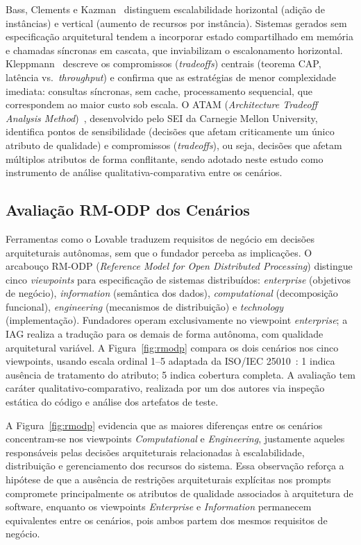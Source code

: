 \documentclass[sigconf]{acmart}
\begin{document}
Bass, Clements e Kazman~\cite{Bass2021} distinguem escalabilidade horizontal
(adição de instâncias) e vertical (aumento de recursos por instância). Sistemas
gerados sem especificação arquitetural tendem a incorporar estado compartilhado em
memória e chamadas síncronas em cascata, que inviabilizam o escalonamento
horizontal. Kleppmann~\cite{Kleppmann2017} descreve os compromissos (\textit{tradeoffs}) centrais (teorema
CAP, latência vs.\ \textit{throughput}) e confirma que as estratégias de menor complexidade
imediata: consultas síncronas, sem cache, processamento sequencial, que correspondem
ao maior custo sob escala. O ATAM (\textit{Architecture Tradeoff Analysis
Method})~\cite{Kazman2000}, desenvolvido pelo SEI da Carnegie Mellon University,
identifica pontos de sensibilidade (decisões que afetam criticamente um único
atributo de qualidade) e compromissos (\textit{tradeoffs}), ou seja, decisões que afetam múltiplos atributos de forma conflitante, sendo adotado neste estudo como instrumento de análise
qualitativa-comparativa entre os cenários.

\subsection{Avaliação RM-ODP dos Cenários}
\label{sec:rmodp}

Ferramentas como o Lovable traduzem requisitos de negócio em decisões arquiteturais
autônomas, sem que o fundador perceba as implicações. O arcabouço RM-ODP (\textit{Reference Model for Open Distributed Processing}) distingue cinco
\textit{viewpoints} para especificação de sistemas distribuídos: \textit{enterprise}
(objetivos de negócio), \textit{information} (semântica dos dados),
\textit{computational} (decomposição funcional), \textit{engineering} (mecanismos
de distribuição) e \textit{technology} (implementação). Fundadores operam
exclusivamente no viewpoint \textit{enterprise}; a IAG realiza a tradução para os
demais de forma autônoma, com qualidade arquitetural variável. A
Figura~\ref{fig:rmodp} compara os dois cenários nos cinco viewpoints, usando escala
ordinal 1--5 adaptada da ISO/IEC 25010~\cite{ISO25010}: 1 indica ausência de
tratamento do atributo; 5 indica cobertura completa. A avaliação tem caráter
qualitativo-comparativo, realizada por um dos autores via inspeção estática do
código e análise dos artefatos de teste.

A Figura~\ref{fig:rmodp} evidencia que as maiores diferenças entre os cenários
concentram-se nos viewpoints \textit{Computational} e \textit{Engineering}, justamente
aqueles responsáveis pelas decisões arquiteturais relacionadas à escalabilidade,
distribuição e gerenciamento dos recursos do sistema. Essa observação reforça a
hipótese de que a ausência de restrições arquiteturais explícitas nos prompts
compromete principalmente os atributos de qualidade associados à arquitetura de
software, enquanto os viewpoints \textit{Enterprise} e \textit{Information} permanecem
equivalentes entre os cenários, pois ambos partem dos mesmos requisitos de negócio.
\end{document}
